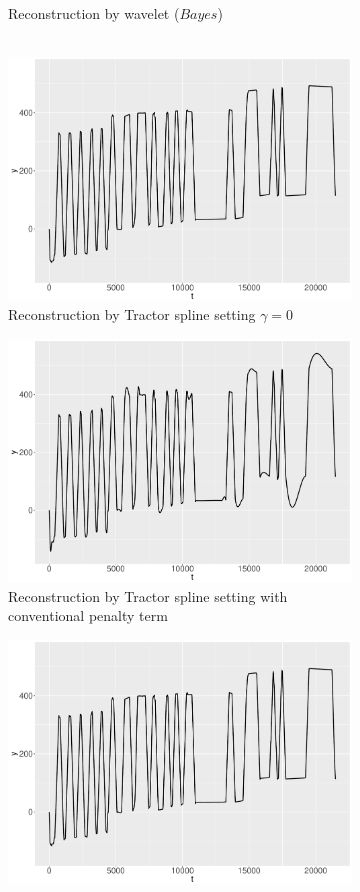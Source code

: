 \begin{figure}
\begin{subfigure}{0.45\textwidth}
    \caption{Reconstruction by wavelet ($\textit{Bayes}$)\\ \mbox{  }}\label{ggRealdataYBayes}
    \end{subfigure}
    \begin{subfigure}{0.45\textwidth}
    \centering
    \includegraphics[width=\linewidth,height=0.5\textwidth]{Chapters/02TractorSplineTheory/plot/ggplot/ggRealdataYTractorGamma.pdf}
    \caption{Reconstruction by Tractor spline setting  $\gamma=0$ }\label{ggRealdataYTractorGamma}
    \end{subfigure}
    \begin{subfigure}{0.45\textwidth}
    \centering
    \includegraphics[width=\linewidth,height=0.5\textwidth]{Chapters/02TractorSplineTheory/plot/ggplot/ggRealdataYTractorAPT.pdf}
    \caption{Reconstruction by Tractor spline setting with conventional penalty term}\label{ggRealdataYTractorAPT}
    \end{subfigure}
    \begin{subfigure}{0.45\textwidth}
    \centering
    \includegraphics[width=\linewidth,height=0.5\textwidth]{Chapters/02TractorSplineTheory/plot/ggplot/ggRealdataYTractor.pdf}

\end{subfigure}
\end{figure}
